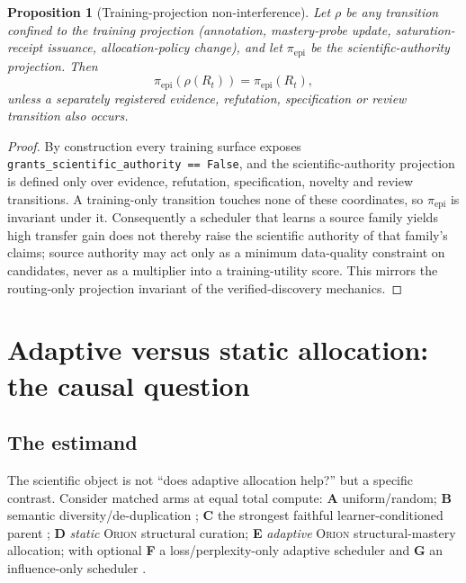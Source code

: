 \documentclass[11pt]{article}
\newtheorem{proposition}{Proposition}
\newcommand{\RAKL}{\textsc{Orion}}
\newcommand{\code}[1]{\texttt{#1}}
\begin{document}
\begin{proposition}[Training-projection non-interference]
\label{prop:noninterference}
Let $\rho$ be any transition confined to the training projection (annotation, mastery-probe update, saturation-receipt issuance, allocation-policy change), and let $\pi_{\mathrm{epi}}$ be the scientific-authority projection. Then
\[
\pi_{\mathrm{epi}}(\rho(R_t))=\pi_{\mathrm{epi}}(R_t),
\]
unless a separately registered evidence, refutation, specification or review transition also occurs.
\end{proposition}
\begin{proof}
By construction every training surface exposes \code{grants\_scientific\_authority == False}, and the scientific-authority projection is defined only over evidence, refutation, specification, novelty and review transitions. A training-only transition touches none of these coordinates, so $\pi_{\mathrm{epi}}$ is invariant under it. Consequently a scheduler that learns a source family yields high transfer gain does not thereby raise the scientific authority of that family's claims; source authority may act only as a minimum data-quality constraint on candidates, never as a multiplier into a training-utility score. This mirrors the routing-only projection invariant of the verified-discovery mechanics.
\end{proof}

\section{Adaptive versus static allocation: the causal question}
\label{sec:causal}

\subsection{The estimand}
The scientific object is not ``does adaptive allocation help?'' but a specific contrast. Consider matched arms at equal total compute: \textbf{A} uniform/random; \textbf{B} semantic diversity/de-duplication \cite{tirumala2023d4,abbas2023semdedup}; \textbf{C} the strongest faithful learner-conditioned parent \cite{he2026stat,yu2024mates,chen2023skillit}; \textbf{D} \emph{static} \RAKL{} structural curation; \textbf{E} \emph{adaptive} \RAKL{} structural-mastery allocation; with optional \textbf{F} a loss/perplexity-only adaptive scheduler and \textbf{G} an influence-only scheduler \cite{xia2024less}.
\end{document}
